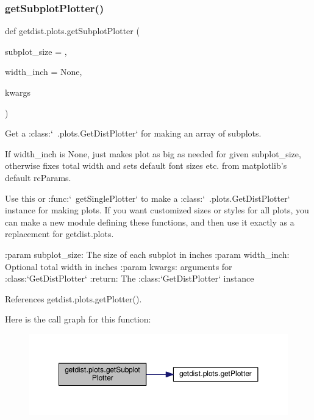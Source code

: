 \subsubsection{\texorpdfstring{get\+Subplot\+Plotter()}{getSubplotPlotter()}}
{\footnotesize\ttfamily def getdist.\+plots.\+get\+Subplot\+Plotter (\begin{DoxyParamCaption}\item[{}]{subplot\+\_\+size = {},  }\item[{}]{width\+\_\+inch = {\ttfamily None},  }\item[{}]{kwargs }\end{DoxyParamCaption})}

\begin{DoxyVerb}Get a :class:`~.plots.GetDistPlotter` for making an array of subplots. 

If width_inch is None, just makes plot as big as needed for given subplot_size, otherwise fixes total width 
and sets default font sizes etc. from matplotlib's default rcParams.

Use this or :func:`~getSinglePlotter` to make a :class:`~.plots.GetDistPlotter` instance for making plots.
If you want customized sizes or styles for all plots, you can make a new module
defining these functions, and then use it exactly as a replacement for getdist.plots.

:param subplot_size: The size of each subplot in inches
:param width_inch: Optional total width in inches
:param kwargs: arguments for :class:`GetDistPlotter`
:return: The :class:`GetDistPlotter` instance
\end{DoxyVerb}
 

References getdist.\+plots.\+get\+Plotter().

Here is the call graph for this function\+:
\nopagebreak
\begin{figure}[H]
\begin{center}
\leavevmode
\includegraphics[width=350pt]{namespacegetdist_1_1plots_a97e7cbfb3b0571b6c44b8313f8b6cdc9_cgraph}
\end{center}
\end{figure}
\mbox{\label{namespacegetdist_1_1plots_a4baafa26a8f5db6c9860985644f8fefe}} 
